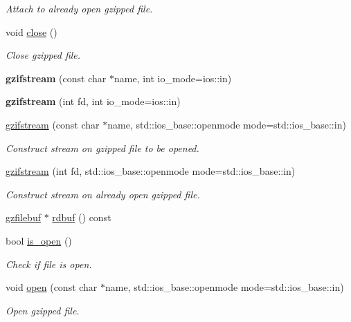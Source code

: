 \begin{DoxyCompactItemize}
\begin{DoxyCompactList}\small\item\em Attach to already open gzipped file. \end{DoxyCompactList}\item 
void \hyperlink{classgzifstream_a073fadd9dc90195c47a6ae2d863c8ace}{close} ()
\begin{DoxyCompactList}\small\item\em Close gzipped file. \end{DoxyCompactList}\item 
\mbox{\label{classgzifstream_a56e464903ee517fb3377f9d8a2977694}} 
{\bfseries gzifstream} (const char $\ast$name, int io\+\_\+mode=ios\+::in)
\item 
\mbox{\label{classgzifstream_ab1380a28c963c7b3b85dc63d0d11cc1a}} 
{\bfseries gzifstream} (int fd, int io\+\_\+mode=ios\+::in)
\item 
\hyperlink{classgzifstream_a90f6e0eea83b7ce3c64f755b51b5b011}{gzifstream} (const char $\ast$name, std\+::ios\+\_\+base\+::openmode mode=std\+::ios\+\_\+base\+::in)
\begin{DoxyCompactList}\small\item\em Construct stream on gzipped file to be opened. \end{DoxyCompactList}\item 
\hyperlink{classgzifstream_aa5ab9dcc3ab35bffe781f4c49239826e}{gzifstream} (int fd, std\+::ios\+\_\+base\+::openmode mode=std\+::ios\+\_\+base\+::in)
\begin{DoxyCompactList}\small\item\em Construct stream on already open gzipped file. \end{DoxyCompactList}\item 
\hyperlink{classgzfilebuf}{gzfilebuf} $\ast$ \hyperlink{classgzifstream_a1c5a0ab4f99f8d8e3406af7bfd82b133}{rdbuf} () const
\item 
bool \hyperlink{classgzifstream_a8e9de13b311b698ef0ccc276b71c7941}{is\+\_\+open} ()
\begin{DoxyCompactList}\small\item\em Check if file is open. \end{DoxyCompactList}\item 
void \hyperlink{classgzifstream_a8105f9300d36dafbe8b10c204583f5a1}{open} (const char $\ast$name, std\+::ios\+\_\+base\+::openmode mode=std\+::ios\+\_\+base\+::in)
\begin{DoxyCompactList}\small\item\em Open gzipped file. \end{DoxyCompactList}\item 

\end{DoxyCompactItemize}
